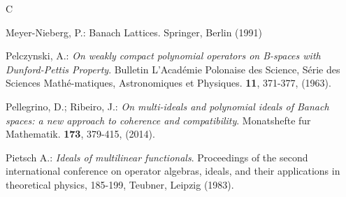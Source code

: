 \documentclass[12 pt]{article}%
\newtheorem{final remark}[theorem]{Final Remark}
\begin{document}
\begin{thebibliography}{C}
	
	 Meyer-Nieberg, P.: Banach Lattices. Springer, Berlin (1991)
	
	
	 Pelczynski, A.: {\it On weakly compact polynomial operators on B-spaces with Dunford-Pettis Property}. Bulletin L'Académie Polonaise des Science, Série des Sciences Mathé-matiques, Astronomiques et Physiques. {\bf 11}, 371-377, (1963).
	
	 Pellegrino, D.; Ribeiro, J.: {\it On multi-ideals and polynomial ideals of Banach spaces: a new approach to coherence and compatibility}. Monatshefte fur Mathematik. {\bf 173}, 379-415, (2014).
	
	
	
	
	
	 Pietsch A.: {\it Ideals of multilinear functionals}. Proceedings of the second international conference on operator algebras, ideals, and their applications in theoretical physics, 185-199, Teubner, Leipzig (1983).
	
	
	
	
	
	

\end{thebibliography}
\end{document}
